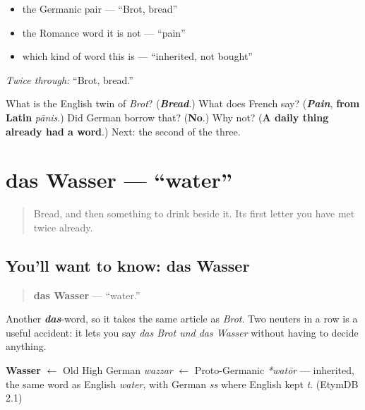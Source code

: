 \begin{itemize}
\raggedright
  \item the Germanic pair — \textquotedblleft{}Brot, bread\textquotedblright{}
  \item the Romance word it is not — \textquotedblleft{}pain\textquotedblright{}
  \item which kind of word this is — \textquotedblleft{}inherited, not bought\textquotedblright{}
\end{itemize}

\emph{Twice through:} \textquotedblleft{}Brot, bread.\textquotedblright{}

\begin{tcolorbox}[breakable,colback=teal!4,colframe=teal!35!black,title={Before you move on}]
What is the English twin of \emph{Brot}? (\emph{\textbf{Bread}}.) What does French say? (\emph{\textbf{Pain}}, \textbf{from Latin} \emph{pānis}.) Did German borrow that? (\textbf{No}.) Why not? (\textbf{A daily thing already had a word}.) Next: the second of the three.
\end{tcolorbox}
\section[das Wasser]{das Wasser — \textquotedblleft{}water\textquotedblright{}}

\label{lesson:GE-C11-wasser}



\begin{quote}
Bread, and then something to drink beside it. Its first letter you have met twice already.
\end{quote}

\subsection*{You'll want to know: das Wasser}
\begin{quote}
\textbf{das Wasser} — \textquotedblleft{}water.\textquotedblright{}
\end{quote}

Another \emph{\textbf{das}}-word, so it takes the same article as \emph{Brot}. Two neuters in a row is a useful accident: it lets you say \emph{das Brot und das Wasser} without having to decide anything.

\begin{cousinweb}
\textbf{Wasser} $\leftarrow$ Old High German \emph{wazzar} $\leftarrow$ Proto-Germanic \emph{*watōr} — inherited, the same word as English \emph{water}, with German \emph{ss} where English kept \emph{t}. (EtymDB 2.1)
\end{cousinweb}


